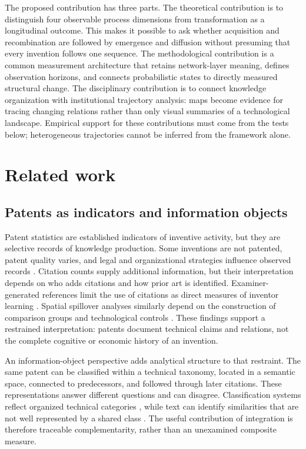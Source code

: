 The proposed contribution has three parts. The theoretical contribution is to
distinguish four observable process dimensions from transformation as a longitudinal
outcome. This makes it possible to ask whether acquisition and recombination are
followed by emergence and diffusion without presuming that every invention follows
one sequence. The methodological contribution is a common measurement architecture
that retains network-layer meaning, defines observation horizons, and connects
probabilistic states to directly measured structural change. The disciplinary
contribution is to connect knowledge organization with institutional trajectory
analysis: maps become evidence for tracing changing relations rather than only
visual summaries of a technological landscape. Empirical support for these
contributions must come from the tests below; heterogeneous trajectories cannot be
inferred from the framework alone.

\section{Related work}\label{sec:related}
\subsection{Patents as indicators and information objects}
Patent statistics are established indicators of inventive activity, but they are
selective records of knowledge production. Some inventions are not patented, patent
quality varies, and legal and organizational strategies influence observed records
\citep{griliches1990,nagaoka2010}. Citation counts supply additional information, but
their interpretation depends on who adds citations and how prior art is identified.
Examiner-generated references limit the use of citations as direct measures of
inventor learning \citep{alcacer2006}. Spatial spillover analyses similarly depend
on the construction of comparison groups and technological controls
\citep{jaffe1993,thompson2005}. These findings support a restrained interpretation:
patents document technical claims and relations, not the complete cognitive or
economic history of an invention.

An information-object perspective adds analytical structure to that restraint.
The same patent can be classified within a technical taxonomy, located in a semantic
space, connected to predecessors, and followed through later citations. These
representations answer different questions and can disagree. Classification
systems reflect organized technical categories \citep{leydesdorff2008}, while text
can identify similarities that are not well represented by a shared class
\citep{whalen2020,kelly2021,sarica2020}. The useful contribution of integration is
therefore traceable complementarity, rather than an unexamined composite measure.

